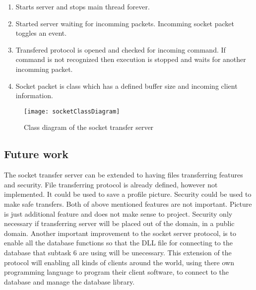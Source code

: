 \begin{enumerate}
	\item Starts server and stops main thread forever.
	\item Started server waiting for incomming packets. Incomming socket packet toggles an event.
	\item Transfered protocol is opened and checked for incoming command. If command is not recognized then execution is stopped and waits for another incomming packet.
	\item Socket packet is class which has a defined buffer size and incoming client information.
\end{enumerate}

\begin{figure}[h]
	\centering
		\texttt{[image: socketClassDiagram]}
	\caption{Class diagram of the socket transfer server}
	\label{fig:socketClassDiagram}
\end{figure}

\subsection{Future work}

The socket transfer server can be extended to having files transferring features and security. File transferring protocol is already defined, however not implemented. It could be used to save a profile picture. Security could be used to make safe transfers. Both of above mentioned features are not important. Picture is just additional feature and does not make sense to project. Security only necessary if transferring server will be placed out of the domain, in a public domain. Another important improvement to the socket server protocol, is to enable all the database functions so that the DLL file for connecting to the database that subtask 6 are using will be unecessary. This extension of the protocol will enabling all kinds of clients around the world, using there own programming language to program their client software, to connect to the database and manage the database library.